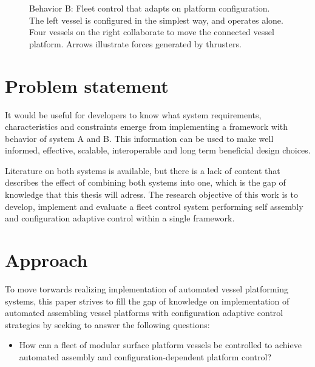 \begin{figure}[h!]
{\begin{minipage}{0.45\textwidth}
			\caption{Behavior B: Fleet control that adapts on platform configuration. The left vessel is configured in the simplest way, and operates alone. Four vessels on the right collaborate to move the connected vessel platform. Arrows illustrate forces generated by thrusters. }
			\label{exaB}
		\end{minipage}
	}
\end{figure}

\section{Problem statement}
It would be useful for developers to know what system requirements, characteristics and constraints emerge from implementing a framework with behavior of system A and B. This information can be used to make well informed, effective, scalable, interoperable and long term beneficial design choices. 

Literature on both systems is available, but there is a lack of content that describes the effect of combining both systems into one, which is the gap of knowledge that this thesis will adress. The research objective of this work is to develop, implement and evaluate a fleet control system performing self assembly and configuration adaptive control within a single framework. 
\newpage
\section{Approach}
To move torwards realizing implementation of automated vessel platforming systems, this paper strives to fill the gap of knowledge on implementation of automated assembling vessel platforms with configuration adaptive control strategies by seeking to answer the following questions:\\

\begin{itemize}
	\item How can a fleet of modular surface platform vessels be controlled to achieve automated assembly and configuration-dependent platform control?
\end{itemize}

